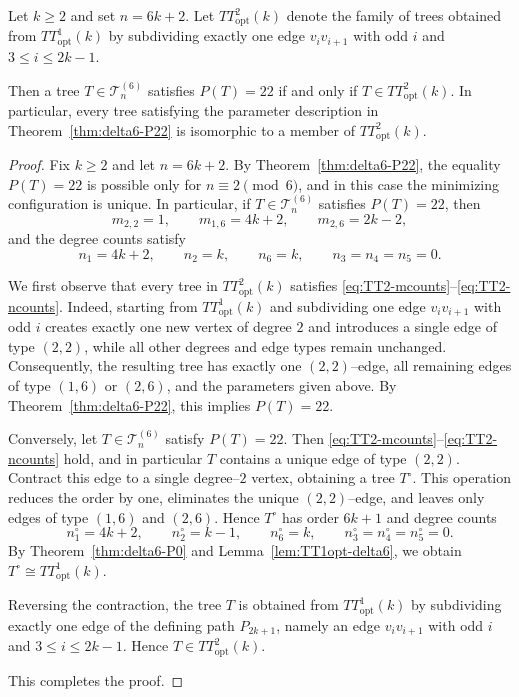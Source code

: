 \documentclass[preprint,12pt]{elsarticle}
\begin{document}
\begin{lemma}
\label{lem:TT2opt-delta6}
Let $k\ge 2$ and set $n=6k+2$.
Let $TT^2_{\mathrm{opt}}(k)$ denote the family of trees obtained from
$TT^1_{\mathrm{opt}}(k)$ by subdividing exactly one edge $v_iv_{i+1}$ with odd
$i$ and $3\le i\le 2k-1$.

Then a tree $T\in\mathcal{T}^{(6)}_n$ satisfies $P(T)=22$
if and only if $T\in TT^2_{\mathrm{opt}}(k)$.
In particular, every tree satisfying the parameter description in
Theorem~\ref{thm:delta6-P22} is isomorphic to a member of $TT^2_{\mathrm{opt}}(k)$.
\end{lemma}

\begin{proof}
Fix $k\ge 2$ and let $n=6k+2$.
By Theorem~\ref{thm:delta6-P22}, the equality $P(T)=22$ is possible only for
$n\equiv 2\pmod 6$, and in this case the minimizing configuration is unique.
In particular, if $T\in\mathcal{T}^{(6)}_n$ satisfies $P(T)=22$, then
\begin{equation}
m_{2,2}=1,\qquad
m_{1,6}=4k+2,\qquad
m_{2,6}=2k-2,
\label{eq:TT2-mcounts}
\end{equation}
and the degree counts satisfy
\begin{equation}
n_1=4k+2,\qquad
n_2=k,\qquad
n_6=k,\qquad
n_3=n_4=n_5=0.
\label{eq:TT2-ncounts}
\end{equation}

\medskip
We first observe that every tree in $TT^2_{\mathrm{opt}}(k)$ satisfies
\eqref{eq:TT2-mcounts}--\eqref{eq:TT2-ncounts}.
Indeed, starting from $TT^1_{\mathrm{opt}}(k)$ and subdividing one edge
$v_iv_{i+1}$ with odd $i$ creates exactly one new vertex of degree $2$ and
introduces a single edge of type $(2,2)$, while all other degrees and edge types
remain unchanged.
Consequently, the resulting tree has exactly one $(2,2)$–edge, all remaining
edges of type $(1,6)$ or $(2,6)$, and the parameters given above.
By Theorem~\ref{thm:delta6-P22}, this implies $P(T)=22$.

\medskip
Conversely, let $T\in\mathcal{T}^{(6)}_n$ satisfy $P(T)=22$.
Then \eqref{eq:TT2-mcounts}--\eqref{eq:TT2-ncounts} hold, and in particular $T$
contains a unique edge of type $(2,2)$.
Contract this edge to a single degree–$2$ vertex, obtaining a tree $T^\circ$.
This operation reduces the order by one, eliminates the unique $(2,2)$–edge,
and leaves only edges of type $(1,6)$ and $(2,6)$.
Hence $T^\circ$ has order $6k+1$ and degree counts
\[
n^\circ_1=4k+2,\qquad n^\circ_2=k-1,\qquad n^\circ_6=k,
\qquad n^\circ_3=n^\circ_4=n^\circ_5=0.
\]
By Theorem~\ref{thm:delta6-P0} and Lemma~\ref{lem:TT1opt-delta6}, we obtain
$T^\circ\cong TT^1_{\mathrm{opt}}(k)$.

Reversing the contraction, the tree $T$ is obtained from
$TT^1_{\mathrm{opt}}(k)$ by subdividing exactly one edge of the defining path
$P_{2k+1}$, namely an edge $v_iv_{i+1}$ with odd $i$ and $3\le i\le 2k-1$.
Hence $T\in TT^2_{\mathrm{opt}}(k)$.

\medskip
This completes the proof.
\end{proof}
\end{document}

